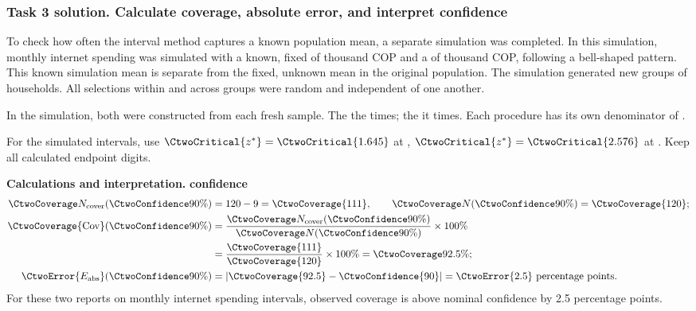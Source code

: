 \subsubsection*{Task 3 solution. Calculate coverage, absolute error, and interpret confidence}
\label{sol:c2-advanced-b-c}
To check how often the interval method captures a known population mean, a separate simulation was completed. In this simulation, monthly internet spending was simulated with a known, fixed  of  thousand COP and a  of  thousand COP, following a bell-shaped pattern. This known simulation mean is separate from the fixed, unknown mean in the original population. The simulation generated  new groups of  households. All selections within and across groups were random and independent of one another.

In the simulation, both  were constructed from each fresh sample.
The    the   times; the    it  times. Each procedure has its own denominator of .

For the simulated intervals, use $\CtwoCritical{z^*}=\CtwoCritical{1.645}$ at , $\CtwoCritical{z^*}=\CtwoCritical{2.576}$ at . Keep all calculated endpoint digits.

\textbf{Calculations and interpretation.}
\textbf{ confidence}\nopagebreak[4]
\begin{align*}
\CtwoCoverCount(\CtwoConfidence{90\%})&=120-9=\CtwoCoverage{111},
\qquad\CtwoTotalCount(\CtwoConfidence{90\%})=\CtwoCoverage{120};\\
\CtwoCoverage{\mathrm{Cov}}(\CtwoConfidence{90\%})
&=\frac{\CtwoCoverCount(\CtwoConfidence{90\%})}{\CtwoTotalCount(\CtwoConfidence{90\%})}\times100\%
\\
&=\frac{\CtwoCoverage{111}}{\CtwoCoverage{120}}\times100\%=\CtwoCoverage{92.5\%};\\
\CtwoError{E_{\rm abs}}(\CtwoConfidence{90\%})
&=\left|\CtwoCoverage{92.5}-\CtwoConfidence{90}\right|=\CtwoError{2.5}\ \text{percentage points}.
\end{align*}
For these two reports on monthly internet spending intervals, observed coverage is above nominal confidence by 2.5 percentage points.

